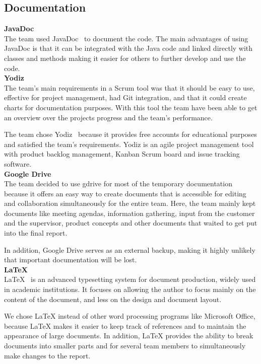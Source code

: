 \subsection{Documentation}

\noindent\textbf{JavaDoc}\\
The team used JavaDoc~\cite{javadoc} to document the code. The main advantages of using JavaDoc is that it can be integrated with the Java code and linked directly with classes and methods making it easier for others to further develop and use the code.\\

\noindent\textbf{Yodiz}\\
The team's main requirements in a Scrum tool was that it should be easy to use, effective for project management, had Git integration, and that it could create charts for documentation purposes. With this tool the team have been able to get an overview over the projects progress and the team's performance. 

The team chose Yodiz~\cite{yodiz} because it provides free accounts for educational purposes and satisfied the team's requirements. Yodiz is an agile project management tool with product backlog management, Kanban Scrum board and issue tracking software.\\

\noindent\textbf{Google Drive}\\
The team decided to use \gls{gdrive} for most of the temporary documentation because it offers an easy way to create documents that is accessible for editing and collaboration simultaneously for the entire team. Here, the team mainly kept documents like meeting agendas, information gathering, input from the customer and the supervisor, product concepts and other documents that waited to get put into the final report. 

In addition, Google Drive serves as an external backup, making it highly unlikely that important documentation will be lost. \\


\noindent\textbf{\LaTeX}\\
LaTeX~\cite{latex} is an advanced typesetting system for document production, widely used in
academic institutions. It focuses on allowing the author to focus mainly on the content of the document, and less on the design and document layout.

We chose LaTeX instead of other word processing programs like Microsoft Office, because LaTeX makes it easier to keep track of references and to maintain the appearance of large
documents. In addition, LaTeX provides the ability to break documents into smaller parts and for several team members to simultaneously make changes to the report.


